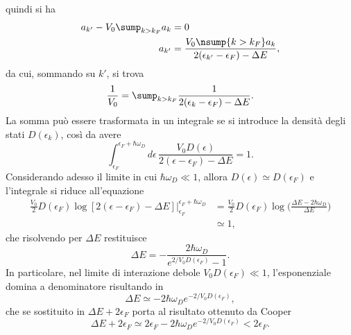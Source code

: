 quindi si ha
\begin{align}
    [2(\epsilon_{k'} - \epsilon_F) - \Delta E]a_{k'} - V_0\sump_{k > k_F}a_k &= 0 \\
    a_{k'} &= \frac{V_0\nsump{k > k_F}a_k}{2(\epsilon_{k'} - \epsilon_F) - \Delta E},
\end{align}
da cui, sommando su $k'$, si trova
\begin{equation}
    \frac{1}{V_0} = \sump_{k > k_F}\frac{1}{2(\epsilon_k - \epsilon_F) - \Delta E}.
\end{equation}
La somma può essere trasformata in un integrale se si introduce la densità degli stati $D(\epsilon_k)$, così da avere
\begin{equation}
    \int_{\epsilon_F}^{\epsilon_F + \hbar\omega_D}d\epsilon\,\frac{V_0D(\epsilon)}{2(\epsilon - \epsilon_F) - \Delta E} = 1.
\end{equation}
Considerando adesso il limite in cui $\hbar\omega_D \ll 1$, allora $D(\epsilon) \simeq D(\epsilon_F)$ e l'integrale si riduce all'equazione
\begin{equation}
    \begin{split}
        \frac{V_0}{2}D(\epsilon_F)\log{[2(\epsilon - \epsilon   _F) - \Delta E]}|_{\epsilon_F}^{\epsilon_F + \hbar\omega_D} &= \frac{V_0}{2}D(\epsilon_F)\log{\bigg(\frac{\Delta E - 2\hbar\omega_D}{\Delta E}\bigg)} \\
        &\simeq 1,
    \end{split}
\end{equation}
che risolvendo per $\Delta E$ restituisce
\begin{equation}
\label{eq: differenza di energia stati BCS}
    \Delta E = -\frac{2\hbar\omega_D}{e^{2/V_0D(\epsilon_F)} - 1}.
\end{equation}
In particolare, nel limite di interazione debole $V_0D(\epsilon_F) \ll 1$, l'esponenziale domina a denominatore risultando in 
\begin{equation}
\label{eq: differenza di energia stati BCS limite interazione debole}
    \Delta E \simeq -2\hbar\omega_De^{-2/V_0D(\epsilon_F)},
\end{equation}
che se sostituito in $\Delta E + 2\epsilon_F$ porta al risultato ottenuto da Cooper
\begin{equation}
    \Delta E + 2\epsilon_F \simeq 2\epsilon_F - 2\hbar\omega_De^{-2/V_0D(\epsilon_F)} < 2\epsilon_F.
\end{equation}
